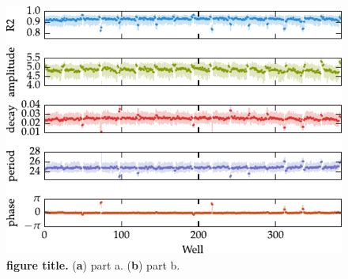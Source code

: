 \documentclass[11pt, letterpaper]{article}
\begin{document}
\begin{figure}[tbp]
  \begin{center}
    \includegraphics[]{figures/pdfs/zhang_wells.pdf}
  \end{center}
  \caption{{\bfseries figure title.}
({\bfseries a}) part a.
({\bfseries b}) part b.}
\label{fig:well_variation}
\end{figure}
\end{document}
